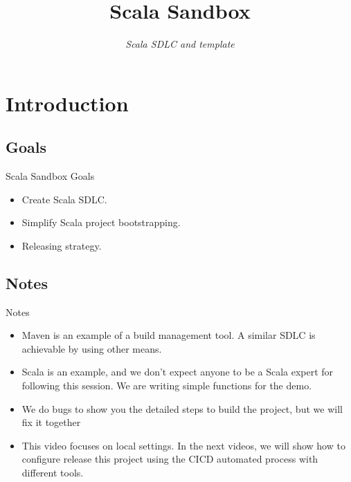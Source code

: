 \documentclass[
    aspectratio=1610
]{beamer}
\title[Scala Sandbox]{Scala Sandbox}
\subtitle{\textit{Scala SDLC and template}}
\begin{document}
    \maketitle



    \section{Introduction}\label{sec:introduction}

    \subsection{Goals}\label{subsec:goals}
    \begin{frame}{Scala Sandbox Goals}
        \begin{itemize}[<+- | alert@+>]
            \item Create Scala SDLC.
            \item Simplify Scala project bootstrapping.
            \item Releasing strategy.
        \end{itemize}
    \end{frame}

    \subsection{Notes}\label{subsec:notes}
    \begin{frame}{Notes}
        \begin{itemize}[<+- | alert@+>]
            \item Maven is an example of a build management tool.
            A similar SDLC is achievable by using other means.
            \item Scala is an example, and we don't expect anyone to be a Scala expert for following this session.
            We are writing simple functions for the demo.
            \item We do bugs to show you the detailed steps to build the project, but we will fix it together
            \item This video focuses on local settings.
            In the next videos, we will show how to configure release this project using the CICD automated process with different tools.
        \end{itemize}
    \end{frame}
\end{document}
